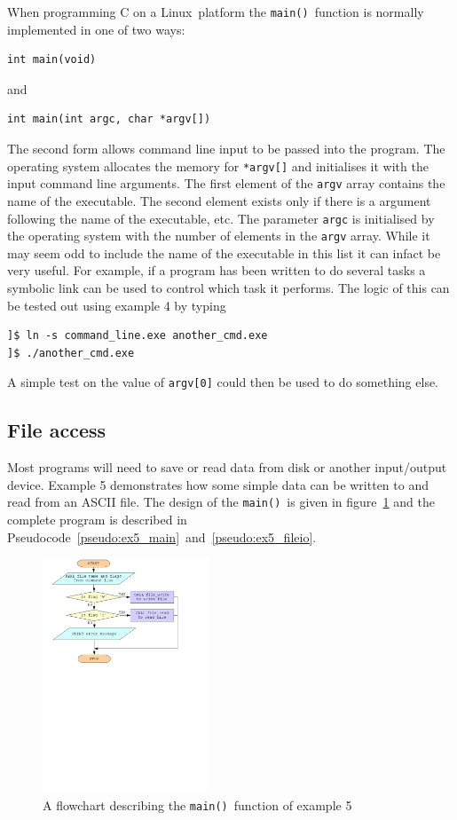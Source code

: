 \documentclass[11pt]{scrartcl}
\def\main{\texttt{main()}}
\def\psc{Pseudocode}
\def\linux{Linux}
\begin{document}
When programming C on a \linux\ platform the \main\ function is normally
implemented in one of two ways:
\begin{lstlisting}
int main(void)
\end{lstlisting}
and
\begin{lstlisting}
int main(int argc, char *argv[])
\end{lstlisting}
The second form allows command line input to be passed into the
program.  The operating system allocates the memory for
\texttt{*argv[]} and initialises it with the input command line
arguments.  The first element of the \texttt{argv} array contains the
name of the executable.  The second element exists only if there is a
argument following the name of the executable, etc.  The parameter
\texttt{argc} is initialised by the operating system with the number
of elements in the \texttt{argv} array.  While it may seem odd to
include the name of the executable in this list it can infact be
very useful.  For example, if a program has been written to do several
tasks a symbolic link can be used to control which task it performs.
The logic of this can be tested out using example 4 by typing
\begin{verbatim}
]$ ln -s command_line.exe another_cmd.exe
]$ ./another_cmd.exe
\end{verbatim}
A simple test on the value of \texttt{argv[0]} could then be used to
do something else.

\subsection{File access}
Most programs will need to save or read data from disk or another
input/output device.  Example 5 demonstrates how some simple data can
be written to and read from an ASCII file.  The design of the \main\ is given in figure~\ref{figure:flowchart_ex5} and the complete program is described in \psc~\ref{pseudo:ex5_main}~and~\ref{pseudo:ex5_fileio}.
\begin{figure}[h]
\begin{center}
\includegraphics[height=7cm]{figures/ex5}
\caption{A flowchart describing the \main\ function of example 5
\label{figure:flowchart_ex5}}
\end{center}
\end{figure}
\end{document}
